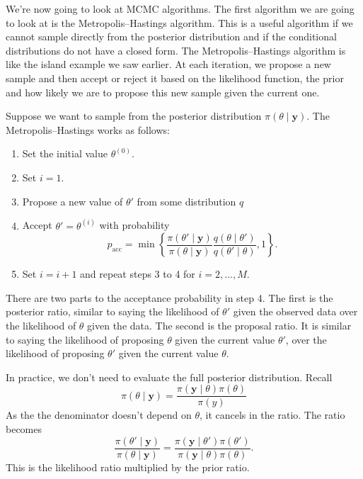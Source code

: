 \documentclass[
]{book}
\theoremstyle{definition}
\theoremstyle{definition}
\theoremstyle{definition}
\theoremstyle{definition}
\theoremstyle{remark}
\begin{document}
We're now going to look at MCMC algorithms. The first algorithm we are going to look at is the Metropolis--Hastings algorithm. This is a useful algorithm if we cannot sample directly from the posterior distribution and if the conditional distributions do not have a closed form. The Metropolis--Hastings algorithm is like the island example we saw earlier. At each iteration, we propose a new sample and then accept or reject it based on the likelihood function, the prior and how likely we are to propose this new sample given the current one.

Suppose we want to sample from the posterior distribution \(\pi(\theta \mid \boldsymbol{y})\). The Metropolis--Hastings works as follows:

\begin{enumerate}
\def\labelenumi{\arabic{enumi}.}
\item
  Set the initial value \(\theta^{(0)}\).
\item
  Set \(i = 1\).
\item
  Propose a new value of \(\theta'\) from some distribution \(q\)
\item
  Accept \(\theta' = \theta^{(i)}\) with probability
  \[
  p_{\textrm{acc}} = \min\left\{\frac{\pi(\theta' \mid \boldsymbol{y})}{\pi(\theta \mid \boldsymbol{y})}\frac{q(\theta \mid \theta')}{q(\theta' \mid \theta)}, 1\right\}.
  \]
\item
  Set \(i = i+1\) and repeat steps 3 to 4 for \(i = 2, \ldots, M\).
\end{enumerate}

There are two parts to the acceptance probability in step 4. The first is the posterior ratio, similar to saying the likelihood of \(\theta'\) given the observed data over the likelihood of \(\theta\) given the data. The second is the proposal ratio. It is similar to saying the likelihood of proposing \(\theta\) given the current value \(\theta'\), over the likelihood of proposing \(\theta'\) given the current value \(\theta\).

In practice, we don't need to evaluate the full posterior distribution. Recall
\[
\pi(\theta \mid \boldsymbol{y}) = \frac{\pi(\boldsymbol{y} \mid \theta) \pi(\theta)}{\pi(y)}
\]
As the the denominator doesn't depend on \(\theta\), it cancels in the ratio. The ratio becomes
\[
\frac{\pi(\theta' \mid \boldsymbol{y})}{\pi(\theta \mid \boldsymbol{y})} = \frac{\pi(\boldsymbol{y} \mid \theta') \pi(\theta')}{\pi(\boldsymbol{y} \mid \theta) \pi(\theta)}.
\]
This is the likelihood ratio multiplied by the prior ratio.
\end{document}

